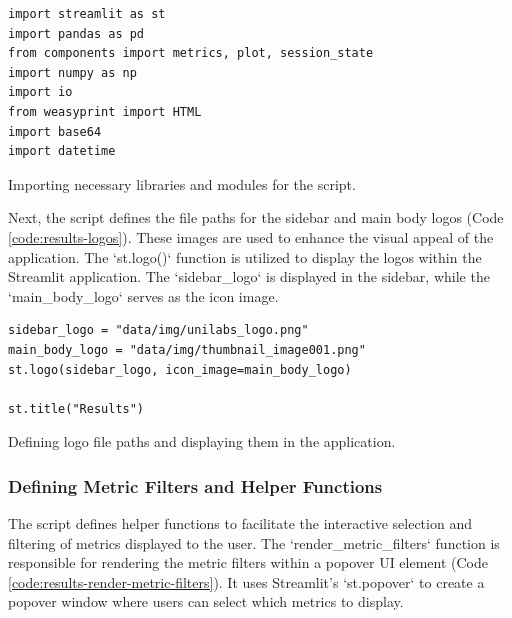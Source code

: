 \begin{longlisting}
\begin{verbatim}
import streamlit as st
import pandas as pd
from components import metrics, plot, session_state
import numpy as np
import io
from weasyprint import HTML
import base64
import datetime
\end{verbatim}
\caption{Importing necessary libraries and modules for the script.}
\label{code:results-imports}
\end{longlisting}

Next, the script defines the file paths for the sidebar and main body logos (Code \ref{code:results-logos}). These images are used to enhance the visual appeal of the application. The `st.logo()` function is utilized to display the logos within the Streamlit application. The `sidebar\_logo` is displayed in the sidebar, while the `main\_body\_logo` serves as the icon image.

\begin{longlisting}
\begin{verbatim}
sidebar_logo = "data/img/unilabs_logo.png"
main_body_logo = "data/img/thumbnail_image001.png"
st.logo(sidebar_logo, icon_image=main_body_logo)

st.title("Results")
\end{verbatim}
\caption{Defining logo file paths and displaying them in the application.}
\label{code:results-logos}
\end{longlisting}

\subsubsection{\textbf{Defining Metric Filters and Helper Functions}}

The script defines helper functions to facilitate the interactive selection and filtering of metrics displayed to the user. The `render\_metric\_filters` function is responsible for rendering the metric filters within a popover UI element (Code \ref{code:results-render-metric-filters}). It uses Streamlit's `st.popover` to create a popover window where users can select which metrics to display.

